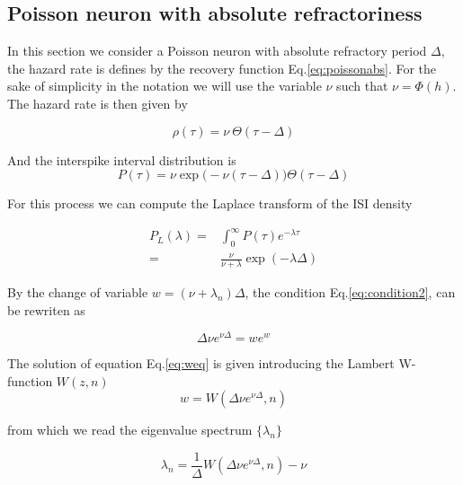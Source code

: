 \documentclass[12pt,twoside]{report}
\begin{document}
\subsection{Poisson neuron with absolute refractoriness}
\label{subsec:absref}

In this section we consider a Poisson neuron with absolute refractory period $\Delta$, the hazard rate is defines by the recovery function Eq.\eqref{eq:poissonabs}. For the sake of simplicity in the notation we will use the variable $\nu$ such that $\nu=\Phi(h)$. The hazard rate is then given by

\begin{equation}
\rho(\tau)=\nu\:\Theta(\tau-\Delta)
\end{equation}


And the interspike interval distribution is 
\begin{equation}
P(\tau)=\nu\exp\big(-\nu(\tau-\Delta)\big) \Theta(\tau-\Delta) 
\end{equation}


For this process we can compute the Laplace transform of the ISI density

\begin{align}
P_L(\lambda)=&\int_0^\infty P(\tau)e^{-\lambda \tau}\nonumber\\
=&\frac{\nu}{\nu+\lambda}\exp(-\lambda \Delta)
\end{align}


By the change of variable $w=(\nu+\lambda_n)\Delta$, the condition Eq.\eqref{eq:condition2}, can be rewriten as


\begin{equation}
\label{eq:weq}
\Delta \nu e^{\nu\Delta}=we^{w} 
\end{equation}

The solution of equation Eq.\eqref{eq:weq} is given introducing the Lambert W-function $W(z,n)$
\begin{equation}
w=W(\Delta \nu e^{\nu\Delta},n)
\end{equation}

from which we read the eigenvalue spectrum $\{\lambda_n\}$

\begin{equation}
\lambda_n=\frac{1}{\Delta}W(\Delta \nu e^{\nu\Delta},n) - \nu
\end{equation}
\end{document}

